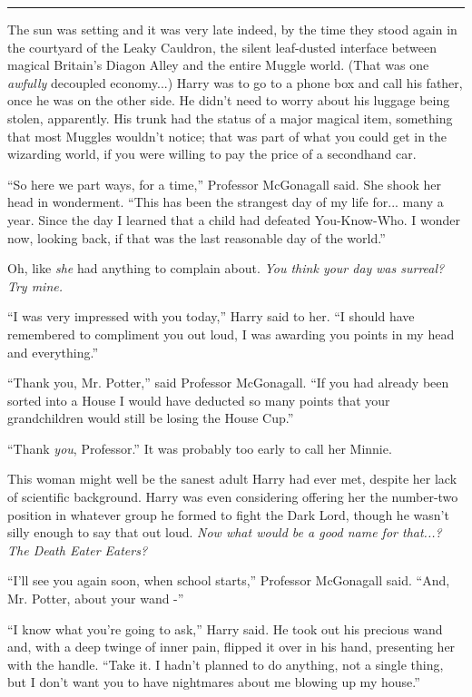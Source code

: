 \begin{center}\rule{3in}{0.4pt}\end{center}

The sun was setting and it was very late indeed, by the time they stood
again in the courtyard of the Leaky Cauldron, the silent leaf-dusted
interface between magical Britain's Diagon Alley and the entire Muggle
world. (That was one \emph{awfully} decoupled economy...) Harry was
to go to a phone box and call his father, once he was on the other side.
He didn't need to worry about his luggage being stolen, apparently. His
trunk had the status of a major magical item, something that most
Muggles wouldn't notice; that was part of what you could get in the
wizarding world, if you were willing to pay the price of a secondhand
car.

``So here we part ways, for a time,'' Professor McGonagall said. She
shook her head in wonderment. ``This has been the strangest day of my
life for... many a year. Since the day I learned that a child had
defeated You-Know-Who. I wonder now, looking back, if that was the last
reasonable day of the world.''

Oh, like \emph{she} had anything to complain about. \emph{You think your
day} \emph{was surreal? Try mine.}

``I was very impressed with you today,'' Harry said to her. ``I should
have remembered to compliment you out loud, I was awarding you points in
my head and everything.''

``Thank you, Mr. Potter,'' said Professor McGonagall. ``If you had
already been sorted into a House I would have deducted so many points
that your grandchildren would still be losing the House Cup.''

``Thank \emph{you}, Professor.'' It was probably too early to call her
Minnie.

This woman might well be the sanest adult Harry had ever met, despite
her lack of scientific background. Harry was even considering offering
her the number-two position in whatever group he formed to fight the
Dark Lord, though he wasn't silly enough to say that out loud. \emph{Now
what would be a good name for that...? The Death Eater Eaters?}

``I'll see you again soon, when school starts,'' Professor McGonagall
said. ``And, Mr. Potter, about your wand -''

``I know what you're going to ask,'' Harry said. He took out his
precious wand and, with a deep twinge of inner pain, flipped it over in
his hand, presenting her with the handle. ``Take it. I hadn't planned to
do anything, not a single thing, but I don't want you to have nightmares
about me blowing up my house.''

